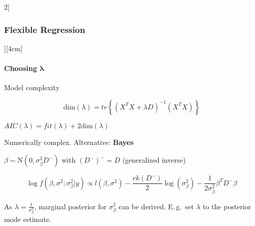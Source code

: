 \documentclass[8pt]{extarticle}
\begin{document}
\begin{multicols}{2}[\subsubsection{Flexible Regression}][4cm]
\paragraph{Choosing $\boldsymbol{\lambda}$} Model complexity


$$\mathrm{dim}(\lambda) = tr\left\{(X^TX + \lambda D)^{-1} (X^TX)\right\} $$\vspace{0.1em}

$AIC(\lambda) = fit(\lambda) + 2\mathrm{dim}(\lambda)$

Numerically complex. Alternative: \textbf{Bayes}

$\beta \sim \mathrm{N}(0,\sigma_\beta^2D^-)$ with $(D^-)^- = D$ (generalized inverse)

$$\log f(\beta, \sigma^2;\sigma_\beta^2|y) \propto l(\beta,\sigma^2) - \frac{rk(D^-)}{2}\log(\sigma^2_\beta) - \frac{1}{2\sigma_\beta^2}\beta^TD^-\beta$$

\noindent As $\lambda = \frac{1}{\sigma_\beta^2}$, marginal posterior for $\sigma_\beta^2$ can be derived. E.\,g.\ set $\lambda$ to the posterior mode estimate.

\end{multicols}
\end{document}
